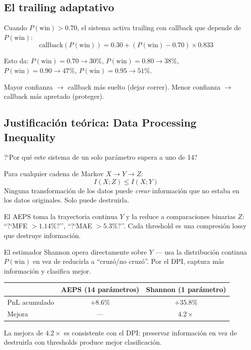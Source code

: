 \documentclass[11pt,a4paper]{article}
\newcommand{\pw}{P(\text{win})}
\begin{document}
\subsection{El trailing adaptativo}

Cuando $\pw > 0.70$, el sistema activa trailing con callback que
depende de $\pw$:
\begin{equation}
\text{callback}(\pw) = 0.30 + (\pw - 0.70) \times 0.833
\end{equation}

Esto da: $\pw = 0.70 \to 30\%$, $\pw = 0.80 \to 38\%$,
$\pw = 0.90 \to 47\%$, $\pw = 0.95 \to 51\%$.

Mayor confianza $\to$ callback m\'as suelto (dejar correr).
Menor confianza $\to$ callback m\'as apretado (proteger).

\subsection{Justificaci\'on te\'orica: Data Processing Inequality}

?`Por qu\'e este sistema de un solo par\'ametro supera a uno de 14?

\begin{tcolorbox}[math, title=Data Processing Inequality (Shannon 1948)]
Para cualquier cadena de Markov $X \to Y \to Z$:
\begin{equation}
I(X; Z) \leq I(X; Y)
\end{equation}
Ninguna transformaci\'on de los datos puede \emph{crear} informaci\'on
que no estaba en los datos originales. Solo puede destruirla.
\end{tcolorbox}

El AEPS toma la trayectoria continua $Y$ y la reduce a comparaciones
binarias $Z$: ``?`MFE $> 1.14\%$?'', ``?`MAE $> 5.3\%$?''. Cada
threshold es una compresi\'on lossy que destruye informaci\'on.

El estimador Shannon opera directamente sobre $Y$ --- usa la
distribuci\'on continua $\pw$ en vez de reducirla a ``cruz\'o/no
cruz\'o''. Por el DPI, captura m\'as informaci\'on y clasifica mejor.

\begin{tcolorbox}[result, title=Resultado emp\'irico]
\begin{center}
\begin{tabular}{lcc}
\toprule
& \textbf{AEPS (14 par\'ametros)} & \textbf{Shannon (1 par\'ametro)} \\
\midrule
PnL acumulado & $+8.6\%$ & $+35.8\%$ \\
Mejora & --- & $4.2\times$ \\
\bottomrule
\end{tabular}
\end{center}
La mejora de $4.2\times$ es consistente con el DPI: preservar
informaci\'on en vez de destruirla con thresholds produce mejor
clasificaci\'on.
\end{tcolorbox}
\end{document}
